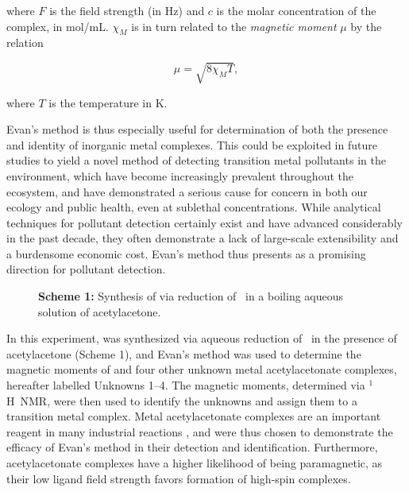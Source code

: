 \documentclass[journal = jacsat, manuscript = article, layout = twocolumn]{achemso}
\newcommand{\h}{$^1$H}
\newcommand{\kmn}{\ce{KMnO4}}
\newcommand{\acac}[1]{\ce{#1(acac)3}}
\begin{document}
where $F$ is the field strength (in Hz) and $c$ is the molar concentration of
the complex, in mol/mL. $\chi_M$ is in turn related to the \emph{magnetic
moment} $\mu$ by the relation

\begin{equation}
	\mu = \sqrt{8 \chi_M T},
\end{equation}

where $T$ is the temperature in K.

Evan's method is thus especially useful for determination of both the presence
and identity of inorganic metal complexes. This could be exploited in future
studies to yield a novel method of detecting transition metal pollutants in the
environment, which have become increasingly prevalent throughout the ecosystem,
and have demonstrated a serious cause for concern in both our ecology and public
health, even at sublethal concentrations. \cite{pollution1, pollution2} While
analytical techniques for pollutant detection certainly exist and have advanced
considerably in the past decade, \cite{detection1, detection2, detection3}  they
often demonstrate a lack of large-scale extensibility and a burdensome economic
cost.  Evan's method thus presents as a promising direction for pollutant
detection.

\begin{figure}

	\caption*{\textbf{Scheme 1:} Synthesis of \acac{Mn} via reduction of
	\kmn\ in a boiling aqueous solution of acetylacetone.}
\end{figure}

In this experiment, \acac{Mn} was synthesized via aqueous reduction of \kmn\ in
the presence of acetylacetone (Scheme 1), and Evan's method was used to
determine the magnetic moments of \acac{Mn} and four other unknown metal
acetylacetonate complexes, hereafter labelled Unknowns 1--4. The magnetic
moments, determined via \h\ NMR, were then used to identify the unknowns and
assign them to a transition metal complex. Metal acetylacetonate complexes are
an important reagent in many industrial reactions \cite{acac_uses}, and were
thus chosen to demonstrate the efficacy of Evan's method in their detection and
identification. Furthermore, acetylacetonate complexes have a higher likelihood
of being paramagnetic, as their low ligand field strength favors formation of
high-spin complexes.\cite{textbook_2}
\end{document}
